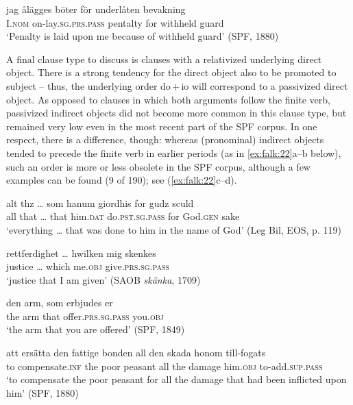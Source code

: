 \documentclass[output=paper]{langscibook}
\begin{document}
\ex \label{ex:falk:21b}
\gll jag      ålägges          böter      för    underlåten  bevakning\\
      I.\textsc{nom}  on-lay.\textsc{sg.prs.pass}  pentalty  for    withheld   guard\\
\glt ‘Penalty is laid upon me because of withheld guard’ (SPF, 1880)
\z
\z

A final clause type to discuss is clauses with a relativized underlying direct object. There is a strong tendency for the direct object also to be promoted to subject – thus, the underlying order do\,+\,io will correspond to a passivized direct object. As opposed to clauses in which both arguments follow the finite verb, passivized indirect objects did not become more common in this clause type, but remained very low even in the most recent part of the SPF corpus. In one respect, there is a difference, though: whereas (pronominal) indirect objects tended to precede the finite verb in earlier periods (as in \ref{ex:falk:22}a–b below), such an order is more or less obsolete in the SPF corpus, although a few examples can be found (9 of 190); see (\ref{ex:falk:22}c–d).


\ea%
    \label{ex:falk:22}
\ea\label{ex:falk:22a}
\gll alt  thz …    som  hanum    giordhis          for    gudz      sculd\\
      all  that …  that  him\textsc{.dat}    do\textsc{.pst.sg.pass}  for    God.\textsc{gen}  sake\\
\glt ‘everything … that was done to him in the name of God’ (Leg Bil, EOS, p. 119)

\ex\label{ex:falk:22b}
\gll rettferdighet … hwilken  mig    skenkes\\
      justice …      which    me\textsc{.obj}   give\textsc{.prs.sg.pass}\\
\glt ‘justice that I am given’ (SAOB \textit{skänka}, 1709)

\ex\label{ex:falk:22c}
\gll den  arm,  som  erbjudes            er\\
      the  arm  that  offer\textsc{.prs.sg.pass}     you.\textsc{obj}\\
\glt ‘the arm that you are offered’ (SPF, 1849)

\ex\label{ex:falk:22d}
\gll att    ersätta        den  fattige  bonden    all  den  skada    honom till-fogats\\
      to    compensate.\textsc{inf}  the  poor    peasant  all  the  damage  him.\textsc{obj}         to-add\textsc{.sup.pass}\\
\glt ‘to compensate the poor peasant for all the damage that had been inflicted upon       him’ (SPF, 1880)
\z
\z
\end{document}
